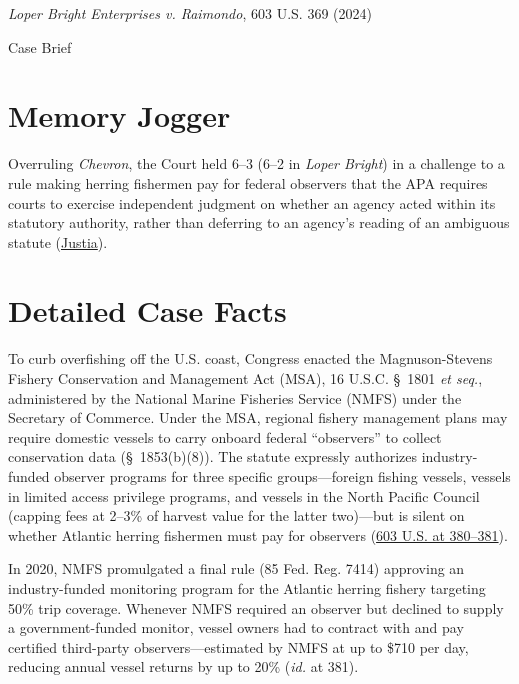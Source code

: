 \documentclass[12pt]{article}
\begin{document}
\begin{center}
{\LARGE \textit{Loper Bright Enterprises v. Raimondo}, 603 U.S. 369 (2024)\par}
\vspace{0.8em}
{\large Case Brief\par}
\end{center}
\vspace{1em}

\section{Memory Jogger}
Overruling \textit{Chevron}, the Court held 6--3 (6--2 in \textit{Loper Bright}) in a challenge to a rule making herring fishermen pay for federal observers that the APA requires courts to exercise independent judgment on whether an agency acted within its statutory authority, rather than deferring to an agency's reading of an ambiguous statute (\href{https://supreme.justia.com/cases/federal/us/603/22-451/}{Justia}).

\section{Detailed Case Facts}
To curb overfishing off the U.S. coast, Congress enacted the Magnuson-Stevens Fishery Conservation and Management Act (MSA), 16 U.S.C. \S~1801 \textit{et seq.}, administered by the National Marine Fisheries Service (NMFS) under the Secretary of Commerce. Under the MSA, regional fishery management plans may require domestic vessels to carry onboard federal ``observers'' to collect conservation data (\S~1853(b)(8)). The statute expressly authorizes industry-funded observer programs for three specific groups---foreign fishing vessels, vessels in limited access privilege programs, and vessels in the North Pacific Council (capping fees at 2--3\% of harvest value for the latter two)---but is silent on whether Atlantic herring fishermen must pay for observers (\href{https://www.law.cornell.edu/supremecourt/text/22-451}{603 U.S. at 380--381}).

In 2020, NMFS promulgated a final rule (85 Fed. Reg. 7414) approving an industry-funded monitoring program for the Atlantic herring fishery targeting 50\% trip coverage. Whenever NMFS required an observer but declined to supply a government-funded monitor, vessel owners had to contract with and pay certified third-party observers---estimated by NMFS at up to \$710 per day, reducing annual vessel returns by up to 20\% (\textit{id.} at 381).
\end{document}
